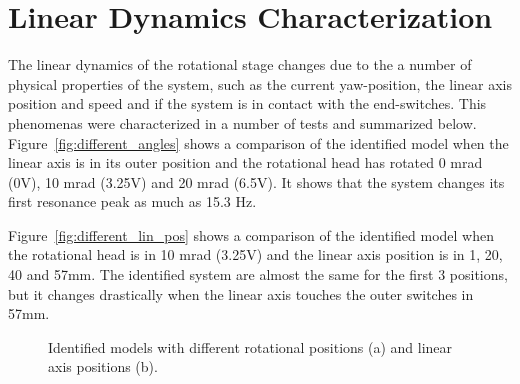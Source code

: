 \section{Linear Dynamics Characterization}
The linear dynamics of the rotational stage changes due to the a number of physical properties of the system, such as the current yaw-position, the linear axis position and speed and if the system is in contact with the end-switches. This phenomenas were characterized in a number of tests and summarized below. Figure~\ref{fig:different_angles} shows a comparison of the identified model when the linear axis is in its outer position and the rotational head has rotated 0 mrad (0V), 10 mrad (3.25V) and 20 mrad (6.5V). It shows that the system changes its first resonance peak as much as 15.3 Hz.

Figure~\ref{fig:different_lin_pos} shows a comparison of the identified model when the rotational head is in 10 mrad (3.25V) and the linear axis position is in 1, 20, 40 and 57mm. The identified system are almost the same for the first 3 positions, but it changes drastically when the linear axis touches the outer switches in 57mm.

\begin{figure}[h!]
  \centering %
  \qquad
  \caption{\label{fig:different_lin_angle} Identified models with different rotational positions (a) and linear axis positions (b).}
\end{figure}

